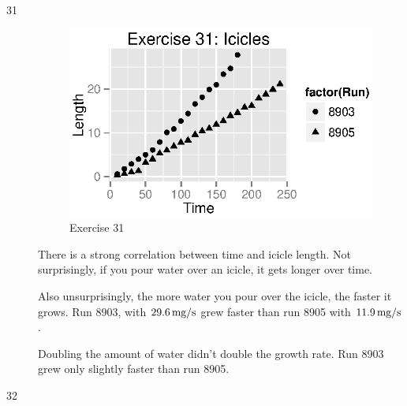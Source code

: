 \documentclass{exam}
\begin{document}
\begin{description}

      \item[31]
        \begin{figure}[H]
          \centering
          \includegraphics{figures/ex31.eps}
          \caption{Exercise 31}
        \end{figure}

        There is a strong correlation between time and icicle length.  Not surprisingly,
        if you pour water over an icicle, it gets longer over time.

        Also unsurprisingly, the more water you pour over the icicle, the faster it grows.
        Run 8903, with $\unit[29.6]{mg/s}$ grew faster than run 8905 with
        $\unit[11.9]{mg/s}$.

        Doubling the amount of water didn't double the growth rate.  Run 8903 grew only
        slightly faster than run 8905.

      \item[32]
        \begin{parts}
          

\end{parts}
\end{description}
\end{document}
